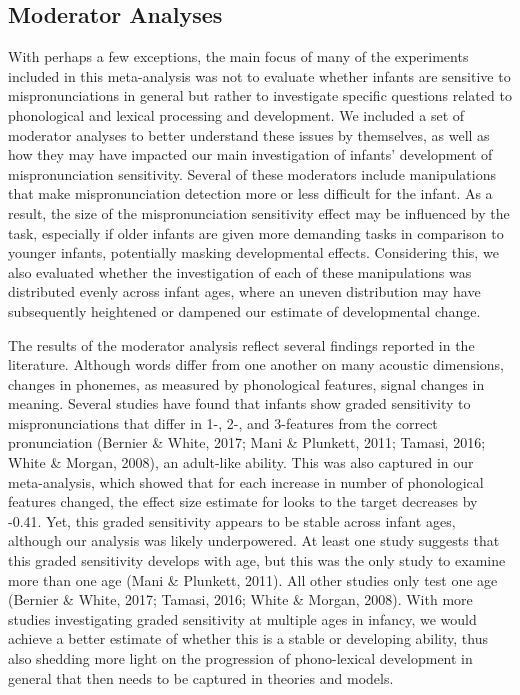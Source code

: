 \documentclass[man]{apa6}
\begin{document}
\hypertarget{moderator-analyses-1}{%
\subsection{Moderator Analyses}\label{moderator-analyses-1}}

With perhaps a few exceptions, the main focus of many of the experiments included in this meta-analysis was not to evaluate whether infants are sensitive to mispronunciations in general but rather to investigate specific questions related to phonological and lexical processing and development. We included a set of moderator analyses to better understand these issues by themselves, as well as how they may have impacted our main investigation of infants' development of mispronunciation sensitivity. Several of these moderators include manipulations that make mispronunciation detection more or less difficult for the infant. As a result, the size of the mispronunciation sensitivity effect may be influenced by the task, especially if older infants are given more demanding tasks in comparison to younger infants, potentially masking developmental effects. Considering this, we also evaluated whether the investigation of each of these manipulations was distributed evenly across infant ages, where an uneven distribution may have subsequently heightened or dampened our estimate of developmental change.

The results of the moderator analysis reflect several findings reported in the literature. Although words differ from one another on many acoustic dimensions, changes in phonemes, as measured by phonological features, signal changes in meaning. Several studies have found that infants show graded sensitivity to mispronunciations that differ in 1-, 2-, and 3-features from the correct pronunciation (Bernier \& White, 2017; Mani \& Plunkett, 2011; Tamasi, 2016; White \& Morgan, 2008), an adult-like ability. This was also captured in our meta-analysis, which showed that for each increase in number of phonological features changed, the effect size estimate for looks to the target decreases by -0.41. Yet, this graded sensitivity appears to be stable across infant ages, although our analysis was likely underpowered. At least one study suggests that this graded sensitivity develops with age, but this was the only study to examine more than one age (Mani \& Plunkett, 2011). All other studies only test one age (Bernier \& White, 2017; Tamasi, 2016; White \& Morgan, 2008). With more studies investigating graded sensitivity at multiple ages in infancy, we would achieve a better estimate of whether this is a stable or developing ability, thus also shedding more light on the progression of phono-lexical development in general that then needs to be captured in theories and models.
\end{document}
